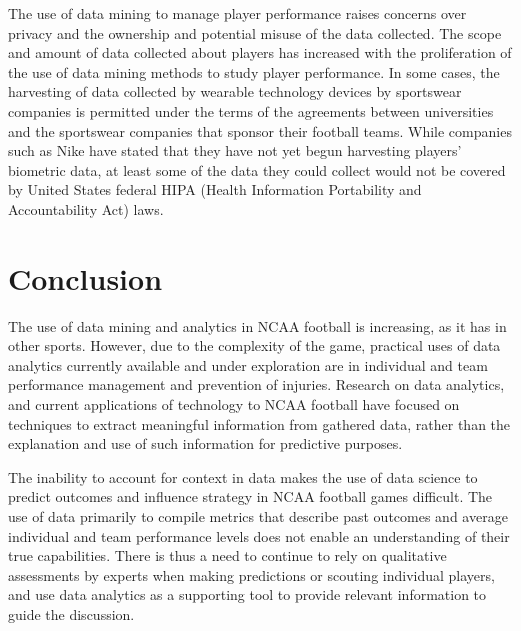 \documentclass[sigconf]{acmart}
\begin{document}
The use of data mining to manage player performance raises concerns over privacy and the ownership and potential misuse of the data collected\cite{Taylor2017}. The scope and amount of data collected about players has increased with the proliferation of the use of data mining methods to study player performance. In some cases, the harvesting of data collected by wearable technology devices by sportswear companies is permitted under the terms of the agreements between universities and the sportswear companies that sponsor their football teams. While companies such as Nike have stated that they have not yet begun harvesting players' biometric data, at least some of the data they could collect would not be covered by United States federal HIPA (Health Information Portability and Accountability Act) laws\cite{Tracy2016}.


\section{Conclusion}
The use of data mining and analytics in NCAA football is increasing, as it has in other sports. However, due to the complexity of the game, practical uses of data analytics currently available and under exploration are in individual and team performance management and prevention of injuries. Research on data analytics, and current applications of technology to NCAA football have focused on techniques to extract meaningful information from gathered data, rather than the explanation and use of such information for predictive purposes. 

The inability to account for context in data makes the use of data science to predict outcomes and influence strategy in NCAA football games difficult. The use of data primarily to compile metrics that describe past outcomes and average individual and team performance levels does not enable an understanding of their true capabilities. There is thus a need to continue to rely on qualitative assessments by experts when making predictions or scouting individual players, and use data analytics as a supporting tool to provide relevant information to guide the discussion.

 


\end{document}

